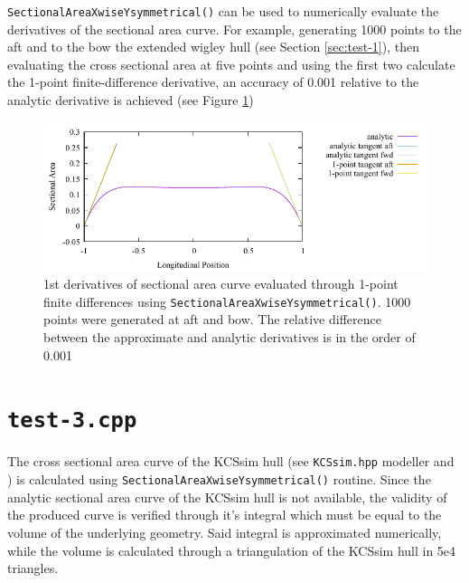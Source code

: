 \documentclass{report}
\begin{document}
\newpar \texttt{SectionalAreaXwiseYsymmetrical()} can be used to numerically evaluate the derivatives of the sectional area curve.
For example, generating 1000 points to the aft and to the bow the extended wigley hull (see Section \ref{sec:test-1}), then evaluating 
the cross sectional area at five points and using the first two calculate the 1-point finite-difference derivative, an accuracy of 
0.001 relative to the analytic derivative is achieved (see Figure \ref{fig:test-2-1K-l-100-derivatives})
\begin{figure}[H]
    \centering
    \includegraphics[width=0.7\linewidth]{figures/test-2-1K-l-100-derivatives.pdf}
    \caption{1st derivatives of sectional area curve evaluated through 1-point finite differences using \texttt{SectionalAreaXwiseYsymmetrical()}. 
    1000 points were generated at aft and bow. The relative difference between the approximate
    and analytic derivatives is in the order of 0.001}
    \label{fig:test-2-1K-l-100-derivatives}
\end{figure}

\section{\texttt{test-3.cpp}}

\newpar The cross sectional area curve of the KCSsim hull (see \texttt{KCSsim.hpp} modeller and \cite{KHAN2022103339}) is calculated 
using \texttt{SectionalAreaXwiseYsymmetrical()} routine. Since the analytic sectional area curve of 
the KCSsim hull is not available, the validity of the produced curve is verified through it's 
integral which must be equal to the volume of the underlying geometry. Said integral is approximated 
numerically, while the volume is calculated through a triangulation of the KCSsim hull in 5e4 triangles.
\end{document}
